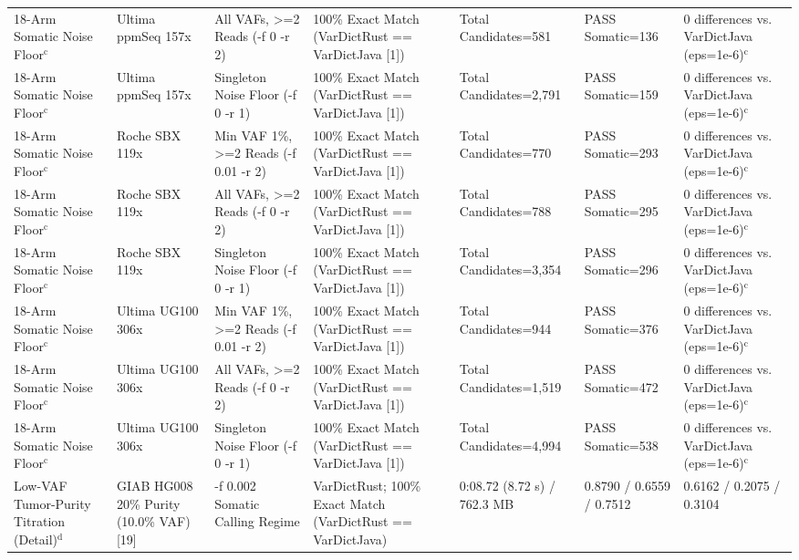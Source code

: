 \begin{table}[htbp]
{\begin{tabular}{lllllll}
18-Arm Somatic Noise Floor$^{\text{c}}$ & Ultima ppmSeq 157x & All VAFs, \textgreater{}=2 Reads (-f 0 -r 2) & 100\% Exact Match (VarDictRust == VarDictJava [1]) & Total Candidates=581 & PASS Somatic=136 & 0 differences vs. VarDictJava (eps=1e-6)$^{\text{c}}$ \\
18-Arm Somatic Noise Floor$^{\text{c}}$ & Ultima ppmSeq 157x & Singleton Noise Floor (-f 0 -r 1) & 100\% Exact Match (VarDictRust == VarDictJava [1]) & Total Candidates=2,791 & PASS Somatic=159 & 0 differences vs. VarDictJava (eps=1e-6)$^{\text{c}}$ \\
18-Arm Somatic Noise Floor$^{\text{c}}$ & Roche SBX 119x & Min VAF 1\%, \textgreater{}=2 Reads (-f 0.01 -r 2) & 100\% Exact Match (VarDictRust == VarDictJava [1]) & Total Candidates=770 & PASS Somatic=293 & 0 differences vs. VarDictJava (eps=1e-6)$^{\text{c}}$ \\
18-Arm Somatic Noise Floor$^{\text{c}}$ & Roche SBX 119x & All VAFs, \textgreater{}=2 Reads (-f 0 -r 2) & 100\% Exact Match (VarDictRust == VarDictJava [1]) & Total Candidates=788 & PASS Somatic=295 & 0 differences vs. VarDictJava (eps=1e-6)$^{\text{c}}$ \\
18-Arm Somatic Noise Floor$^{\text{c}}$ & Roche SBX 119x & Singleton Noise Floor (-f 0 -r 1) & 100\% Exact Match (VarDictRust == VarDictJava [1]) & Total Candidates=3,354 & PASS Somatic=296 & 0 differences vs. VarDictJava (eps=1e-6)$^{\text{c}}$ \\
18-Arm Somatic Noise Floor$^{\text{c}}$ & Ultima UG100 306x & Min VAF 1\%, \textgreater{}=2 Reads (-f 0.01 -r 2) & 100\% Exact Match (VarDictRust == VarDictJava [1]) & Total Candidates=944 & PASS Somatic=376 & 0 differences vs. VarDictJava (eps=1e-6)$^{\text{c}}$ \\
18-Arm Somatic Noise Floor$^{\text{c}}$ & Ultima UG100 306x & All VAFs, \textgreater{}=2 Reads (-f 0 -r 2) & 100\% Exact Match (VarDictRust == VarDictJava [1]) & Total Candidates=1,519 & PASS Somatic=472 & 0 differences vs. VarDictJava (eps=1e-6)$^{\text{c}}$ \\
18-Arm Somatic Noise Floor$^{\text{c}}$ & Ultima UG100 306x & Singleton Noise Floor (-f 0 -r 1) & 100\% Exact Match (VarDictRust == VarDictJava [1]) & Total Candidates=4,994 & PASS Somatic=538 & 0 differences vs. VarDictJava (eps=1e-6)$^{\text{c}}$ \\
Low-VAF Tumor-Purity Titration (Detail)$^{\text{d}}$ & GIAB HG008 20\% Purity (10.0\% VAF) [19] & -f 0.002 Somatic Calling Regime & VarDictRust; 100\% Exact Match (VarDictRust == VarDictJava) & 0:08.72 (8.72 s) / 762.3 MB & 0.8790 / 0.6559 / 0.7512 & 0.6162 / 0.2075 / 0.3104 \\

\end{tabular}}
\end{table}
